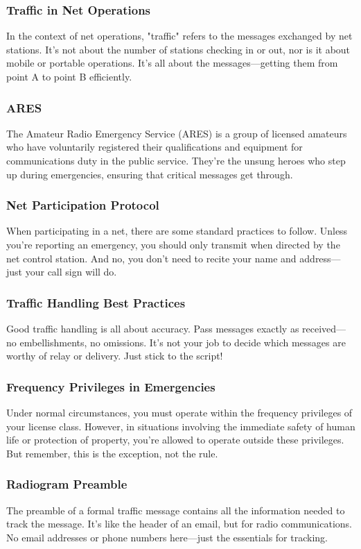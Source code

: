 \subsubsection*{Traffic in Net Operations}
In the context of net operations, "traffic" refers to the messages exchanged by net stations. It's not about the number of stations checking in or out, nor is it about mobile or portable operations. It's all about the messages—getting them from point A to point B efficiently.

\subsubsection*{ARES}
The Amateur Radio Emergency Service (ARES) is a group of licensed amateurs who have voluntarily registered their qualifications and equipment for communications duty in the public service. They're the unsung heroes who step up during emergencies, ensuring that critical messages get through.

\subsubsection*{Net Participation Protocol}
When participating in a net, there are some standard practices to follow. Unless you're reporting an emergency, you should only transmit when directed by the net control station. And no, you don't need to recite your name and address—just your call sign will do.

\subsubsection*{Traffic Handling Best Practices}
Good traffic handling is all about accuracy. Pass messages exactly as received—no embellishments, no omissions. It's not your job to decide which messages are worthy of relay or delivery. Just stick to the script!

\subsubsection*{Frequency Privileges in Emergencies}
Under normal circumstances, you must operate within the frequency privileges of your license class. However, in situations involving the immediate safety of human life or protection of property, you're allowed to operate outside these privileges. But remember, this is the exception, not the rule.

\subsubsection*{Radiogram Preamble}
The preamble of a formal traffic message contains all the information needed to track the message. It's like the header of an email, but for radio communications. No email addresses or phone numbers here—just the essentials for tracking.

